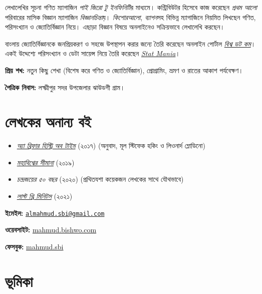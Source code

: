 \documentclass[
]{book}
\providecommand{\tightlist}{%
  \setlength{\itemsep}{0pt}\setlength{\parskip}{0pt}}
\begin{document}
লেখালেখির সূচনা গণিত ম্যাগাজিন \emph{পাই জিরো টু ইনফিনিটি}র মাধ্যমে। কন্ট্রিবিউটর হিসেবে কাজ করেছেন \emph{প্রথম আলো} পরিবারের মাসিক বিজ্ঞান ম্যাগাজিন \emph{বিজ্ঞানচিন্তা}য়। \emph{কিশোরআলো}, \emph{ব্যাপন}সহ বিভিন্ন ম্যাগাজিনে নিয়মিত লিখছেন গণিত, পরিসংখ্যান ও জ্যোতির্বিজ্ঞান নিয়ে। এছাড়া বিজ্ঞান বিষয়ে অনলাইনেও সক্রিয়ভাবে লেখালেখি করছেন।

বাংলায় জ্যোতির্বিজ্ঞানকে জনপ্রিয়করণ ও সহজে উপস্থাপন করার জন্যে তৈরি করেছেন অনলাইন পোর্টাল \href{https://sky.bishwo.com}{\emph{বিশ্ব ডট কম}}। একই উদ্দেশ্যে পরিসংখ্যান ও ডেটা সায়েন্স নিয়ে তৈরি করেছেন \href{https://www.statmania.info}{\emph{Stat Mania}}।

\textbf{প্রিয় শখ:} নতুন কিছু শেখা (বিশেষ করে গণিত ও জ্যোতির্বিজ্ঞান), প্রোগ্রামিং, ভ্রমণ ও রাতের আকাশ পর্যবেক্ষণ।

\textbf{পৈত্রিক নিবাস:} লক্ষ্মীপুর সদর উপজেলার ঝাউডগী গ্রাম।

\hypertarget{ux9b2ux9c7ux996ux995ux9c7ux9b0-ux985ux9a8ux9beux9a8ux9cdux9af-ux9acux987}{%
\section{লেখকের অনান্য বই}\label{ux9b2ux9c7ux996ux995ux9c7ux9b0-ux985ux9a8ux9beux9a8ux9cdux9af-ux9acux987}}

\begin{itemize}
\tightlist
\item
  \emph{\href{https://www.rokomari.com/book/author/47631}{অ্যা ব্রিফার হিস্ট্রি অব টাইম}} (২০১৭) (অনুবাদ, মূল স্টিফেক হকিং ও লিওনার্দ ম্লোডিনো)
\item
  \emph{\href{https://www.rokomari.com/book/author/47631}{মহাবিশ্বের সীমানা}} (২০১৯)
\item
  \emph{চন্দ্রজয়ের ৫০ বছর} (২০২০) (প্রথিতযশা কয়েকজন লেখকের সাথে যৌথভাবে)
\item
  \emph{\href{https://l3m.bishwo.com}{লাস্ট থ্রি মিনিটস}} (২০২১)
\end{itemize}

\textbf{ইমেইল:} \href{mailto:almahmud.sbi@gmail.com}{\nolinkurl{almahmud.sbi@gmail.com}}

\textbf{ওয়েবসাইট:} \href{https://mahmud.bishwo.com}{mahmud.bishwo.com}

\textbf{ফেসবুক:} \href{https://fb.com/mahmud.sbi}{mahmud.sbi}

\hypertarget{ux9adux9c2ux9aeux9bfux995ux9be}{%
\section{ভূমিকা}\label{ux9adux9c2ux9aeux9bfux995ux9be}}
\end{document}
